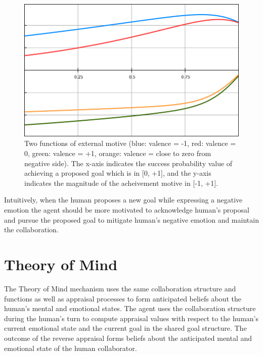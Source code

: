 \documentclass[12pt]{report}
\begin{document}
\begin{figure}[tbh]
  \centering
  \includegraphics[width=1\textwidth]{figure/external_motive_functions.png}
  \caption{Two functions of external motive (blue: valence = -1, red:
  valence = 0, green: valence = +1, orange: valence = close to zero from
  negative side). The x-axis indicates the success probability value of
  achieving a proposed goal which is in [0, +1], and the y-axis indicates the
  magnitude of the acheivement motive in [-1, +1].}
  \label{fig:external-motive-functions}
\end{figure}

Intuitively, when the human proposes a new goal while expressing a negative
emotion the agent should be more motivated to acknowledge human's proposal and
pursue the proposed goal to mitigate human's negative emotion and maintain the
collaboration.

\section{Theory of Mind}
The Theory of Mind mechanism uses the same collaboration structure and functions
as well as appraisal processes to form anticipated beliefs about the human's
mental and emotional states. The agent uses the collaboration structure during the
human's turn to compute appraisal values with respect to the human's current
emotional state and the current goal in the shared goal structure. The outcome
of the reverse appraisal forms beliefs about the anticipated mental and
emotional state of the human collaborator.
\end{document}
